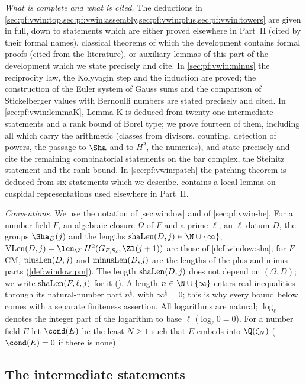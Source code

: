\emph{What is complete and what is cited.} The deductions in \cref{sec:pf:vwin:top,sec:pf:vwin:assembly,sec:pf:vwin:plus,sec:pf:vwin:towers} are given in full, down to statements which are either proved elsewhere in Part~II
(cited by their formal names), classical theorems of which the development contains formal proofs (cited from the
literature), or auxiliary lemmas of this part of the development which we state precisely and cite. In
\cref{sec:pf:vwin:minus} the reciprocity law, the Kolyvagin step and the induction are proved; the construction of the
Euler system of Gauss sums and the comparison of Stickelberger values with Bernoulli numbers are stated precisely and
cited. In \cref{sec:pf:vwin:lemmaK}, Lemma K is deduced from twenty-one intermediate statements and a rank bound of Borel
type; we prove fourteen of them, including all which carry the arithmetic (classes from divisors, counting, detection of
powers, the passage to $\Sha$ and to $H^2$, the numerics), and state precisely and cite the remaining combinatorial statements on the bar complex,
the Steinitz statement and the rank bound. In \cref{sec:pf:vwin:patch} the patching theorem is deduced from six statements
which we describe.  contains a local lemma on cuspidal representations used elsewhere in Part~II.

\emph{Conventions.} We use the notation of \cref{sec:window} and of \cref{sec:pf:vwin-he}. For a number field $F$, an
algebraic closure $\Omega$ of $F$ and a prime $\ell$, an $\ell$-datum $D$, the groups $\Sha_D(j)$ and the lengths
$\vwinsh(D,j)\in\N\cup\{\infty\}$, $\vwinVL(D,j)=\len_{\Zl}H^2(G_{F,S_\ell},\Zl(j+1))$ are those of
\cref{def:window:sha}; for $F$ CM, $\mathrm{plusLen}(D,j)$ and $\mathrm{minusLen}(D,j)$ are the lengths of the plus and minus parts
(\cref{def:window:pm}). The length $\mathrm{shaLen}(D,j)$ does not depend on $(\Omega,D)$; we write $\mathrm{shaLen}(F,\ell,j)$ for it
(). A length $n\in\N\cup\{\infty\}$ enters real inequalities
through its natural-number part $n^\natural$, with $\infty^\natural=0$; this is why every bound below comes with a
separate finiteness assertion. All logarithms are natural; $\log_\ell$ denotes the integer part of the logarithm to base
$\ell$ ($\log_\ell 0=0$). For a number field $E$ let $\cond(E)$ be the least $N\ge1$ such that $E$ embeds into
$\Q(\zeta_N)$ ($\cond(E)=0$ if there is none).

\subsection{The intermediate statements}\label{sec:pf:vwin:stmts}


